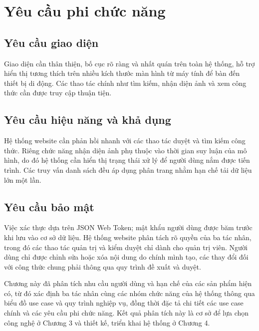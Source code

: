 \documentclass[../DoAn.tex]{subfiles}
\begin{document}
\section{Yêu cầu phi chức năng}
\label{sec:2-phichucnang}

\subsection{Yêu cầu giao diện}
Giao diện cần thân thiện, bố cục rõ ràng và nhất quán trên toàn hệ thống, hỗ trợ hiển thị tương thích trên nhiều kích thước màn hình từ máy tính để bàn đến thiết bị di động. Các thao tác chính như tìm kiếm, nhận diện ảnh và xem công thức cần được truy cập thuận tiện.

\subsection{Yêu cầu hiệu năng và khả dụng}
Hệ thống website cần phản hồi nhanh với các thao tác duyệt và tìm kiếm công thức. Riêng chức năng nhận diện ảnh phụ thuộc vào thời gian suy luận của mô hình, do đó hệ thống cần hiển thị trạng thái xử lý để người dùng nắm được tiến trình. Các truy vấn danh sách đều áp dụng phân trang nhằm hạn chế tải dữ liệu lớn một lần.

\subsection{Yêu cầu bảo mật}
Việc xác thực dựa trên JSON Web Token; mật khẩu người dùng được băm trước khi lưu vào cơ sở dữ liệu. Hệ thống website phân tách rõ quyền của ba tác nhân, trong đó các thao tác quản trị và kiểm duyệt chỉ dành cho quản trị viên. Người dùng chỉ được chỉnh sửa hoặc xóa nội dung do chính mình tạo, các thay đổi đối với công thức chung phải thông qua quy trình đề xuất và duyệt.

\bigskip
Chương này đã phân tích nhu cầu người dùng và hạn chế của các sản phẩm hiện có, từ đó xác định ba tác nhân cùng các nhóm chức năng của hệ thống thông qua biểu đồ use case và quy trình nghiệp vụ, đồng thời đặc tả chi tiết các use case chính và các yêu cầu phi chức năng. Kết quả phân tích này là cơ sở để lựa chọn công nghệ ở Chương 3 và thiết kế, triển khai hệ thống ở Chương 4.
\end{document}
